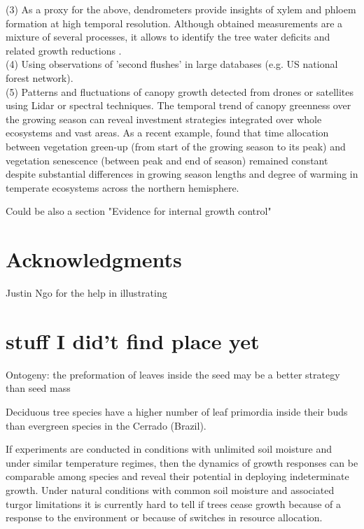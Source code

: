 \documentclass{article}
\begin{document}
	(3) As a proxy for the above, dendrometers provide insights of xylem and phloem formation at high temporal resolution. Although obtained measurements are a mixture of several processes, it allows to identify the tree water deficits and related growth reductions \cite{etzoldNumberGrowthDays2021, zweifelWhyTreesGrow2021}. \\
	
	(4) Using observations of 'second flushes' in large databases (e.g. US national forest network). \\
	
	(5) Patterns and fluctuations of canopy growth detected from drones or satellites using Lidar or spectral techniques. The temporal trend of canopy greenness over the growing season can reveal investment strategies integrated over whole ecosystems and vast areas. As a recent example, \citet{mengConsistentTimeAllocation2024}  found that time allocation between vegetation green-up (from start of the growing season to its peak) and vegetation senescence (between peak and end of season) remained constant despite substantial differences in growing season lengths and degree of warming in temperate ecosystems across the northern hemisphere. 
	
	Could be also a section "Evidence for internal growth control" 

	

	
\section*{Acknowledgments}
	Justin Ngo for the help in illustrating
	

	
	

	
	\pagebreak
	

	\newpage
\section*{stuff I did't find place yet}
Ontogeny: 
the preformation of leaves inside the seed may be a better strategy than seed mass \citep{silvaCouldPresencePreformed2023}


Deciduous tree species have a higher number of leaf primordia inside their buds than evergreen species in the Cerrado (Brazil). 
	
If experiments are conducted in conditions with unlimited soil moisture and under similar temperature regimes, then the dynamics of growth responses can be comparable among species and reveal their potential in deploying indeterminate growth. Under natural conditions with common soil moisture and associated turgor limitations it is currently hard to tell if trees cease growth because of a response to the environment or because of switches in resource allocation. 
\end{document}
